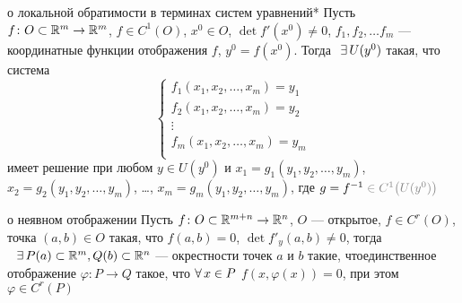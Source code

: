 \begin{teor}[https://www.youtube.com/live/g4Zgeu8xe-Q?si=dyQKDlOGFnTn7A1c&t=1101]{о локальной обратимости в терминах систем уравнений}*%
	Пусть $f \colon O \subset \mathbb R^m \to \mathbb R^m$, $f \in C^1(O)$, $x^0 \in O$, $\det f'(x^0) \ne 0$, $f_1, f_2, \ldots f_m$ --- координатные функции отображения $f$, $y^0 = f(x^0)$. Тогда$\E U(y^0)$ такая, что система
	\[\begin{cases}
		f_1(x_1, x_2, \ldots, x_m) = y_1 \\
		f_2(x_1, x_2, \ldots, x_m) = y_2 \\
		\vdots \\
		f_m(x_1, x_2, \ldots, x_m) = y_m \\
	\end{cases}\]
	имеет решение при любом $y \in U(y^0)$ и $x_1 = g_1 (y_1, y_2, \ldots, y_m)$, $x_2 = g_2 (y_1, y_2, \ldots, y_m)$, \dots, $x_m = g_m (y_1, y_2, \ldots, y_m)$, где $g = f^{-1} \uns{{}\in C^1\bigl(U(y^0)\bigr)}$ 
\end{teor}

\begin{teor}[https://www.youtube.com/live/g4Zgeu8xe-Q?si=Ao2OMHIpDT9XM0eb&t=1372]{о неявном отображении}\label{неявн.отобр.}
	Пусть $f \colon O \subset \mathbb R^{m+n} \to \mathbb R^n$, $O$ --- открытое, $f \in C^r(O)$, точка $(a, b) \in O$ такая, что $f(a, b) = 0$, $\det f'_y(a, b) \ne 0$, тогда$\E P(a) \subset \rmm, Q(b) \subset \rr^n$ --- окрестности точек $a$ и $b$ такие, что\E единствен\-ное отображение $\varphi \colon P \to Q$ такое, что $\forall \, x \in P$ $f(x, \varphi(x)) = 0$, при этом $\varphi \in C^r(P)$
\end{teor}

